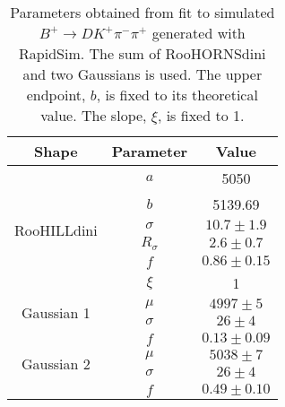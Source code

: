 \begin{table}
  \centering
  \begin{tabular}{ccc}
      \toprule
      Shape & Parameter & Value \\
      \midrule
\multirow{6}{*}{RooHILLdini} & $a$ & 5050 \\
 & $b$ & 5139.69 \\
 & $\sigma$ & $10.7 \pm 1.9$ \\
 & $R_\sigma$ & $2.6 \pm 0.7$ \\
 & $f$ & $0.86 \pm 0.15$ \\
 & $\xi$ & 1 \\
      \midrule
\multirow{2}{*}{Gaussian 1} & $\mu$ & $4997 \pm 5$ \\
 & $\sigma$ & $26 \pm 4$ \\
 & $f$ & $0.13 \pm 0.09$ \\
      \midrule
\multirow{2}{*}{Gaussian 2} & $\mu$ & $5038 \pm 7$ \\
 & $\sigma$ & $26 \pm 4$ \\
 & $f$ & $0.49 \pm 0.10$ \\
      \bottomrule
  \end{tabular}
  \caption{Parameters obtained from fit to simulated $B^+ \to DK^+\pi^-\pi^+$ generated with RapidSim. The sum of RooHORNSdini and two Gaussians is used. The upper endpoint, $b$, is fixed to its theoretical value. The slope, $\xi$, is fixed to 1.}
\label{tab:DKpipi_parameters}
\end{table}
